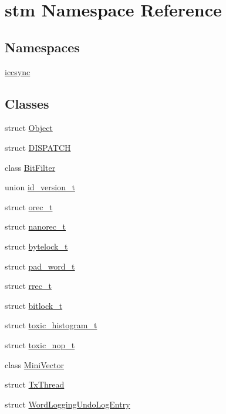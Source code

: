 \hypertarget{namespacestm}{\section{stm Namespace Reference}
\label{namespacestm}
}
\subsection*{Namespaces}
\begin{DoxyCompactItemize}
\item 
\hyperlink{namespacestm_1_1iccsync}{iccsync}
\end{DoxyCompactItemize}
\subsection*{Classes}
\begin{DoxyCompactItemize}
\item 
struct \hyperlink{structstm_1_1Object}{Object}
\item 
struct \hyperlink{structstm_1_1DISPATCH}{D\-I\-S\-P\-A\-T\-C\-H}
\item 
class \hyperlink{classstm_1_1BitFilter}{Bit\-Filter}
\item 
union \hyperlink{unionstm_1_1id__version__t}{id\-\_\-version\-\_\-t}
\item 
struct \hyperlink{structstm_1_1orec__t}{orec\-\_\-t}
\item 
struct \hyperlink{structstm_1_1nanorec__t}{nanorec\-\_\-t}
\item 
struct \hyperlink{structstm_1_1bytelock__t}{bytelock\-\_\-t}
\item 
struct \hyperlink{structstm_1_1pad__word__t}{pad\-\_\-word\-\_\-t}
\item 
struct \hyperlink{structstm_1_1rrec__t}{rrec\-\_\-t}
\item 
struct \hyperlink{structstm_1_1bitlock__t}{bitlock\-\_\-t}
\item 
struct \hyperlink{structstm_1_1toxic__histogram__t}{toxic\-\_\-histogram\-\_\-t}
\item 
struct \hyperlink{structstm_1_1toxic__nop__t}{toxic\-\_\-nop\-\_\-t}
\item 
class \hyperlink{classstm_1_1MiniVector}{Mini\-Vector}
\item 
struct \hyperlink{structstm_1_1TxThread}{Tx\-Thread}
\item 
struct \hyperlink{structstm_1_1WordLoggingUndoLogEntry}{Word\-Logging\-Undo\-Log\-Entry}
\item 

\end{DoxyCompactItemize}
